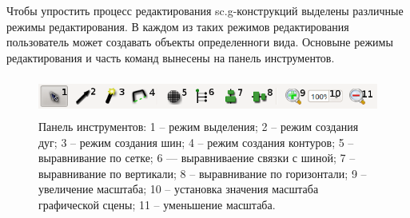 Чтобы упростить процесс редактирования sc.g-конструкций выделены различные режимы редактирования. В каждом из таких режимов редактирования пользователь может создавать объекты определенноги вида. Основыне режимы редактирования и часть команд вынесены на панель инструментов. 
\begin{figure}[h]
	\includegraphics[width=15.77cm, height=1.27cm]{../images/scgtoolbar.png}
	\caption{Панель инструментов: 1 – режим выделения; 2 – режим создания дуг; 3 – режим создания шин; 4 – режим создания контуров; 5 – выравнивание по сетке; 6 — выравниваение связки с шиной; 
7 – выравнивание по вертикали; 8 – выравнивание по горизонтали; 9 – увеличение масштаба; 10 – установка значения масштаба графической сцены; 11 – уменьшение масштаба.}
	\label{scgtoolbar}
\end{figure}

